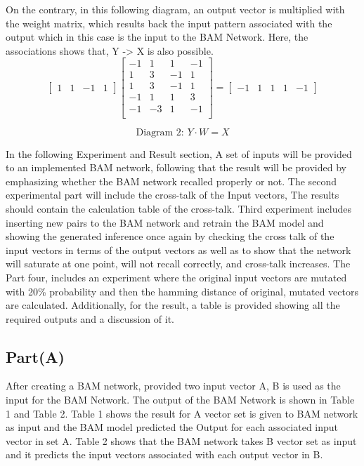 \documentclass[12pt]{article}
\begin{document}
On the contrary, in this following diagram, an output vector is multiplied with the weight matrix, which results back the input pattern associated with the output which in this case is the input to the BAM Network. Here, the associations shows that, Y -> X is also possible. 
\[
\begin{bmatrix}
1 & 1 & -1 & 1
\end{bmatrix}
\begin{bmatrix}
-1 &  1 &  1 & -1 \\
 1 &  3 & -1 &  1 \\
 1 &  3 & -1 &  1 \\
-1 &  1 &  1 &  3 \\
-1 & -3 &  1 & -1 \\
\end{bmatrix}
=
\begin{bmatrix}
-1 & 1 & 1 & 1 & -1
\end{bmatrix}
\]

\[
\text{Diagram 2: } Y \cdot W = X
\]

In the following Experiment and Result section, A set of inputs will be provided to an implemented BAM network, following that the result will be provided by emphasizing whether the BAM network recalled properly or not. The second experimental part will include the cross-talk of the Input vectors, The results should contain the calculation table of the cross-talk. Third experiment includes inserting new pairs to the BAM network and retrain the BAM model and showing the generated inference once again by checking the cross talk of the input vectors in terms of the output vectors as well as to show that the network will saturate at one point, will not recall correctly, and cross-talk increases. The Part four, includes an experiment where the original input vectors are mutated with 20\% probability and then the hamming distance of original, mutated vectors are calculated. Additionally, for the result, a table is provided showing all the required outputs and a discussion of it.

\break

\subsection{Part(A)}

After creating a BAM network, provided two input vector A, B is used as the input for the BAM Network.
The output of the BAM Network is shown in Table 1 and Table 2. Table 1 shows the result for A vector set is given to BAM network as input and the BAM model predicted the Output for each associated input vector in set A. Table 2 shows that the BAM network takes B vector set as input and it predicts the input vectors associated with each output vector in B.
\end{document}
